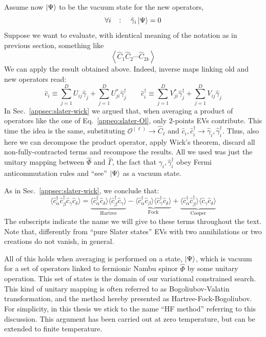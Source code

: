 Assume now $\ket{\Psi}$ to be the vacuum state for the new operators,
\[
	\forall i
	\quad\colon\quad
	\hat \gamma_i \ket{\Psi} = 0
\]
Suppose we want to evaluate, with identical meaning of the notation as in previous section, something like
\[
	\left\langle \hat C_1 \hat C_2 \cdots \hat C_{2k} \right\rangle
\]
We can apply the result obtained above. Indeed, inverse maps linking old and new operators read:
\[
	\hat c_i \equiv \sum_{j=1}^D U_{ij} \hat \gamma_j + \sum_{j=1}^D U_{ji}^* \hat \gamma_j^\dagger
	\qquad
	\hat c_i^\dagger \equiv \sum_{j=1}^D V_{ji}^* \hat \gamma_j^\dagger + \sum_{j=1}^D V_{ij} \hat \gamma_j
\]
In Sec.~\ref{appsec:slater-wick} we argued that, when averaging a product of operators like the one of Eq.~\eqref{appeq:slater-Ol}, only $2$-points EVs contribute. This time the idea is the same, substituting $\mathcal{O}^{(\ell)} \to \hat C_\ell$ and $\hat c_i, \hat c_i^\dagger \to \hat \gamma_i, \hat \gamma_i^\dagger$. Thus, also here we can decompose the product operator, apply Wick's theorem, discard all non-fully-contracted terms and recompose the results. All we used was just the unitary mapping between $\hat \Phi$ and $\hat \Gamma$, the fact that $\gamma_i, \hat \gamma_i^\dagger$ obey Fermi anticommutation rules and ``see'' $\ket{\Psi}$ as a vacuum state.

As in Sec.~\ref{appsec:slater-wick}, we conclude that:
\begin{equation}\label{appeq:hf-wick-hfc}
	\langle
	\hat c_\alpha^\dagger \hat c_\beta^\dagger \hat c_\gamma \hat c_\delta
	\rangle = \underbrace{
		\langle 
		\hat c_\alpha^\dagger \hat c_\delta
		\rangle \langle	
		\hat c_\beta^\dagger \hat c_\gamma 
		\rangle
	}_{\text{Hartree}}
	- 
	\underbrace{
		\langle 
		\hat c_\alpha^\dagger \hat c_\beta
		\rangle \langle	
		\hat c_\gamma^\dagger \hat c_\delta 
		\rangle 
	}_{\text{Fock}}
	+ 
	\underbrace{
		\langle 
		\hat c_\alpha^\dagger \hat c_\beta^\dagger
		\rangle \langle	
		\hat c_\gamma \hat c_\delta 
		\rangle 
	}_{\text{Cooper}}
\end{equation}
The subscripts indicate the name we will give to these terms throughout the text. Note that, differently from ``pure Slater states'' EVs with two annihilations or two creations do not vanish, in general.

All of this holds when averaging is performed on a state, $\ket{\Psi}$, which is vacuum for a set of operators linked to fermionic Nambu spinor $\hat \Phi$ by some unitary operation. This set of states is the domain of our variational constrained search. This kind of unitary mapping is often referred to as Bogoliubov-Valatin transformation, and the method hereby presented as Hartree-Fock-Bogoliubov. For simplicity, in this thesis we stick to the name ``HF method'' referring to this discussion. This argument has been carried out at zero temperature, but can be extended to finite temperature.